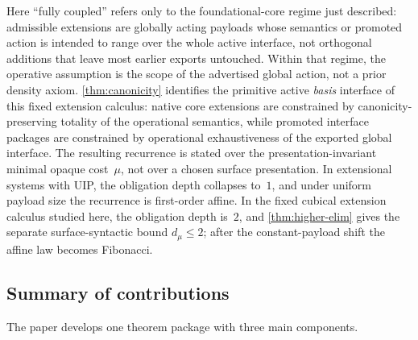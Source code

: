 \documentclass{lmcs}
\begin{document}
Here ``fully coupled'' refers only to the foundational-core regime just described: admissible extensions are globally acting payloads whose semantics or promoted action is intended to range over the whole active interface, not orthogonal additions that leave most earlier exports untouched. Within that regime, the operative assumption is the scope of the advertised global action, not a prior density axiom. \autoref{thm:canonicity} identifies the primitive active \emph{basis} interface of this fixed extension calculus: native core extensions are constrained by canonicity-preserving totality of the operational semantics, while promoted interface packages are constrained by operational exhaustiveness of the exported global interface. The resulting recurrence is stated over the presentation-invariant minimal opaque cost~$\mu$, not over a chosen surface presentation. In extensional systems with UIP, the obligation depth collapses to~$1$, and under uniform payload size the recurrence is first-order affine. In the fixed cubical extension calculus studied here, the obligation depth is~$2$, and \autoref{thm:higher-elim} gives the separate surface-syntactic bound $d_\mu \leq 2$; after the constant-payload shift the affine law becomes Fibonacci.

\subsection{Summary of contributions}

The paper develops one theorem package with three main components.
\end{document}
